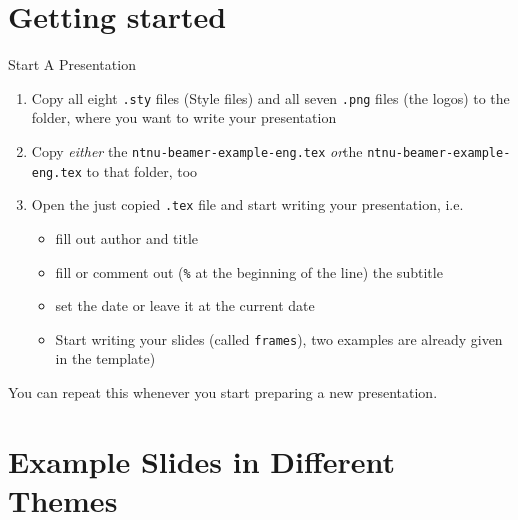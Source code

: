 \documentclass[aspectratio=169]{beamer}
\begin{document}
	\section{Getting started}
		\begin{frame}[fragile]{Start A Presentation}
			\label{slide:start}
			\begin{enumerate}
				\item Copy all eight \lstinline!.sty! files (Style files) and all seven \lstinline!.png! files (the logos) to the folder, where you want to write your presentation
				\item Copy \emph{either} the \lstinline!ntnu-beamer-example-eng.tex! \emph{or}the \lstinline!ntnu-beamer-example-eng.tex! to that folder, too
				\item Open the just copied \lstinline!.tex! file and start writing your presentation, i.e.
				\begin{itemize}
					\item fill out author and title
					\item fill or comment out (\lstinline!%! at the beginning of the line) the subtitle
					\item set the date or leave it at the current date
					\item Start writing your slides (called \lstinline!frames!), two examples are already given in the template)
				\end{itemize}
			\end{enumerate}
			You can repeat this whenever you start preparing a new presentation.
		\end{frame}
	\section{Example Slides in Different Themes}
	
	
	
\end{document}
